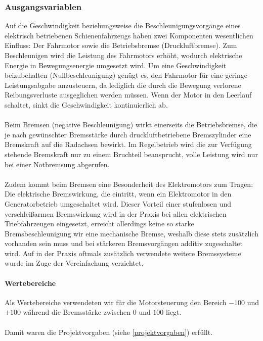 \documentclass[10pt,a4paper]{article}
\begin{document}
\subsubsection{Ausgangsvariablen}
Auf die Geschwindigkeit beziehungsweise die Beschleunigungsvorgänge eines elektrisch betriebenen Schienenfahrzeugs haben zwei Komponenten wesentlichen Einfluss: Der Fahrmotor sowie die Betriebsbremse (Druckluftbremse). Zum Beschleunigen wird die Leistung des Fahrmotors erhöht, wodurch elektrische Energie in Bewegungsenergie umgesetzt wird. Um eine Geschwindigkeit beizubehalten (Nullbeschleunigung) genügt es, den Fahrmotor für eine geringe Leistungsabgabe anzusteuern, da lediglich die durch die Bewegung verlorene Reibungsverluste ausgeglichen werden müssen. Wenn der Motor in den Leerlauf schaltet, sinkt die Geschwindigkeit kontinuierlich ab.
\paragraph{}
Beim Bremsen (negative Beschleunigung) wirkt einerseits die Betriebsbremse, die je nach gewünschter Bremsstärke durch druckluftbetriebene Bremszylinder eine Bremskraft auf die Radachsen bewirkt. Im Regelbetrieb wird die zur Verfügung stehende Bremskraft nur zu einem Bruchteil beansprucht, volle Leistung wird nur bei einer Notbremsung abgerufen.
\paragraph{}
Zudem kommt beim Bremsen eine Besonderheit des Elektromotors zum Tragen: Die elektrische Bremswirkung, die eintritt, wenn ein Elektromotor in den Generatorbetrieb umgeschaltet wird. Dieser Vorteil einer stufenlosen und verschleißarmen Bremswirkung wird in der Praxis bei allen elektrischen Triebfahrzeugen eingesetzt, erreicht allerdings keine so starke Bremsbeschleunigung wir eine mechanische Bremse, weshalb diese stets zusätzlich vorhanden sein muss und bei stärkeren Bremsvorgängen additiv zugeschaltet wird.
Auf in der Praxis oftmals zusätzlich verwendete weitere Bremssysteme wurde im Zuge der Vereinfachung verzichtet.

\paragraph{Wertebereiche}
Als Wertebereiche verwendeten wir für die Motorsteuerung den Bereich $ -100 $ und $ +100 $ während die Bremsstärke zwischen $ 0 $ und $ 100 $ liegt.

\paragraph{}
Damit waren die Projektvorgaben (siehe \ref{projektvorgaben}) erfüllt.
\end{document}
